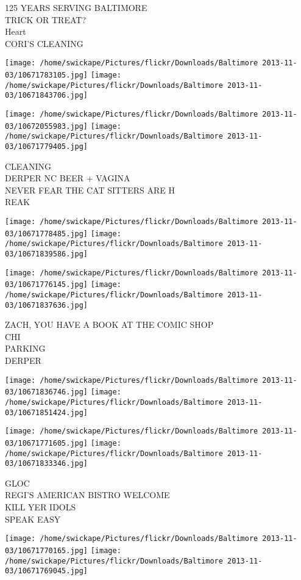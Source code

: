 \documentclass[10pt,letterpaper]{article}
\begin{document}
125 YEARS SERVING BALTIMORE\\
TRICK OR TREAT?\\
Heart\\
CORI'S CLEANING
\pagebreak

\texttt{[image: /home/swickape/Pictures/flickr/Downloads/Baltimore 2013-11-03/10671783105.jpg]}
\texttt{[image: /home/swickape/Pictures/flickr/Downloads/Baltimore 2013-11-03/10671843706.jpg]}

\texttt{[image: /home/swickape/Pictures/flickr/Downloads/Baltimore 2013-11-03/10672055983.jpg]}
\texttt{[image: /home/swickape/Pictures/flickr/Downloads/Baltimore 2013-11-03/10671779405.jpg]}

CLEANING\\
DERPER NC BEER + VAGINA\\
NEVER FEAR THE CAT SITTERS ARE H\\
REAK
\pagebreak

\texttt{[image: /home/swickape/Pictures/flickr/Downloads/Baltimore 2013-11-03/10671778485.jpg]}
\texttt{[image: /home/swickape/Pictures/flickr/Downloads/Baltimore 2013-11-03/10671839586.jpg]}

\texttt{[image: /home/swickape/Pictures/flickr/Downloads/Baltimore 2013-11-03/10671776145.jpg]}
\texttt{[image: /home/swickape/Pictures/flickr/Downloads/Baltimore 2013-11-03/10671837636.jpg]}

ZACH, YOU HAVE A BOOK AT THE COMIC SHOP\\
CHI\\
PARKING\\
DERPER
\pagebreak

\texttt{[image: /home/swickape/Pictures/flickr/Downloads/Baltimore 2013-11-03/10671836746.jpg]}
\texttt{[image: /home/swickape/Pictures/flickr/Downloads/Baltimore 2013-11-03/10671851424.jpg]}

\texttt{[image: /home/swickape/Pictures/flickr/Downloads/Baltimore 2013-11-03/10671771605.jpg]}
\texttt{[image: /home/swickape/Pictures/flickr/Downloads/Baltimore 2013-11-03/10671833346.jpg]}

GLOC\\
REGI'S AMERICAN BISTRO WELCOME\\
KILL YER IDOLS\\
SPEAK EASY
\pagebreak

\texttt{[image: /home/swickape/Pictures/flickr/Downloads/Baltimore 2013-11-03/10671770165.jpg]}
\texttt{[image: /home/swickape/Pictures/flickr/Downloads/Baltimore 2013-11-03/10671769045.jpg]}
\end{document}
